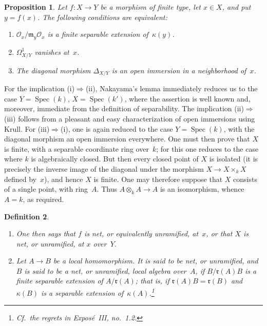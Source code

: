 \documentclass[11pt,oneside]{amsbook}
\newtheorem{proposition}{Proposition}[section]
\newtheorem{definition}[proposition]{Definition}
\begin{document}
\begin{proposition}
\label{I.3.1}
Let \(f\colon X\to Y\) be a morphism of finite type, let \(x\in X\), and
put \(y=f(x)\).  The following conditions are equivalent:
\begin{enumerate}
\item[(i)] 
  \(\mathcal O_x/\mathfrak m_y\mathcal O_x\) is a finite separable
  extension of~\(\kappa(y)\).
\item[(ii)] \(\Omega^1_{X/Y}\) vanishes at~\(x\).
\item[(iii)] The diagonal morphism \(\Delta_{X/Y}\) is an open immersion
  in a neighborhood of~\(x\).
\end{enumerate}
\end{proposition}

For the implication \textup{(i)}\(\Rightarrow\)\textup{(ii)}, Nakayama's
lemma immediately reduces us to the case
\(Y=\operatorname{Spec}(k)\), \(X=\operatorname{Spec}(k')\), where the
assertion is well known and, moreover, immediate from the definition of
separability.  The implication \textup{(ii)}\(\Rightarrow\)\textup{(iii)}
follows from a pleasant and easy characterization of open immersions using
Krull.  For \textup{(iii)}\(\Rightarrow\)\textup{(i)}, one is
again reduced to the case \(Y=\operatorname{Spec}(k)\), with the diagonal
morphism an open immersion everywhere.  One must then prove that \(X\) is
finite, with a separable coordinate ring over~\(k\); for this one reduces to
the case where \(k\) is algebraically closed.  But then every closed point of
\(X\) is isolated (it is precisely the inverse image of the diagonal under
the morphism \(X\to X\times_k X\) defined by~\(x\)), and hence \(X\) is
finite.  One may therefore suppose that \(X\) consists of a single point,
with ring~\(A\).  Thus \(A\otimes_kA\to A\) is an isomorphism, whence
\(A=k\), as required.

\begin{definition}
\label{I.3.2}
\begin{enumerate}
\item[(a)] One then says that \(f\) is \emph{net}, or equivalently
  \emph{unramified}, at~\(x\), or that \(X\) is net, or unramified, at
  \(x\) over~\(Y\).
\item[(b)] Let \(A\to B\) be a local homomorphism.  It is said to be
  \emph{net}, or \emph{unramified}, and \(B\) is said to be a net, or
  unramified, local algebra over~\(A\), if
  \(B/\mathfrak r(A)B\) is a finite separable extension of
  \(A/\mathfrak r(A)\); that is, if
  \(\mathfrak r(A)B=\mathfrak r(B)\) and \(\kappa(B)\) is a separable
  extension of~\(\kappa(A)\).\footnote{Cf.\ the regrets in
  Expos\'e~III, no.~1.2.}
\end{enumerate}
\end{definition}
\end{document}
